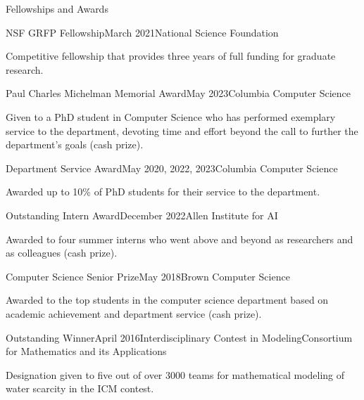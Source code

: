 \documentclass{cv} %
\begin{document}
\begin{rSection}{Fellowships and Awards} \itemsep -2pt

\begin{rSubsection}{NSF GRFP Fellowship}{March 2021}{National Science Foundation}{}
\item Competitive fellowship that provides three years of full funding for graduate research.
\end{rSubsection}

\begin{rSubsection}{Paul Charles Michelman Memorial Award}{May 2023}{Columbia Computer Science}{}
\item Given to a PhD student in Computer Science who has performed exemplary service to the department, devoting time and effort beyond the call to further the department’s goals (cash prize).
\end{rSubsection}

\begin{rSubsection}{Department Service Award}{May 2020, 2022, 2023}{Columbia Computer Science}{}
\item Awarded up to 10\% of PhD students for their service to the department.
\end{rSubsection}

\begin{rSubsection}{Outstanding Intern Award}{December 2022}{Allen Institute for AI}{}
\item Awarded to four summer interns who went above and beyond as researchers and as colleagues (cash prize).
\end{rSubsection}

\begin{rSubsection}{Computer Science Senior Prize}{May 2018}{Brown Computer Science}{}
\item Awarded to the top students in the computer science department based on academic achievement and department service (cash prize).
\end{rSubsection}

\begin{rSubsection}{Outstanding Winner}{April 2016}{Interdisciplinary Contest in Modeling}{Consortium for Mathematics and its Applications}
\item Designation given to five out of over 3000 teams for mathematical modeling of water scarcity in the ICM contest.
\end{rSubsection}

\end{rSection}
\end{document}
